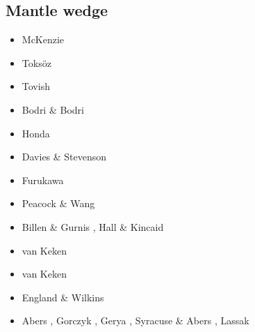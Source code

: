 \subsection{Mantle wedge} 

\begin{scriptsize}
\begin{itemize}
\item[\nineteensixtynine] McKenzie \cite{mcke69}\\
\item[\nineteenseventyone] Toks{\"o}z \etal \cite{tomj71}\\
\item[\nineteenseventyeight] Tovish \etal \cite{tosl78}\\
\item[\nineteenseventynine] Bodri \& Bodri \cite{bobo79}\\
\item[\nineteeneightyfive] Honda \cite{hond85}\\
\item[\nineteenninetytwo] Davies \& Stevenson \cite{dast92}\\
\item[\nineteenninetythree] Furukawa \cite{furu93}\\
\item[\nineteenninetynine] Peacock \& Wang \cite{pewa99}\\
\item[\twothousandone] Billen \& Gurnis \cite{bigu01}, Hall \& Kincaid \cite{haki01}\\
\item[\twothousandtwo] van Keken \etal \cite{vakp02}\\
\item[\twothousandthree] van Keken \cite{vank03}\\
\item[\twothousandfour] England \& Wilkins \cite{enwi04}\\
\item[\twothousandsix] Abers \etal \cite{abvk06}, Gorczyk \etal \cite{gogc06},
                       Gerya \etal \cite{gecy06}, Syracuse \& Abers \cite{syab06},
                       Lassak \etal \cite{lafh06}\\

\end{itemize}
\end{scriptsize}
